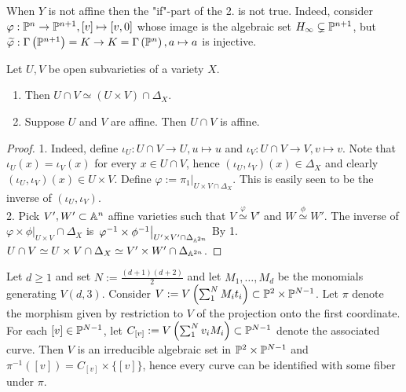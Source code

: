         \begin{remark}
            When $Y$ is not affine then the "if"-part of the 2. is not true. Indeed, consider $\varphi: \mathbb{P}^n\rightarrow \mathbb{P}^{n+1}, [v]\mapsto [v,0]$ whose image is the algebraic set $H_\infty \subsetneq \mathbb{P}^{n+1}$, but $\widetilde{\varphi}: \Gamma\left(\mathbb{P}^{n+1}\right)=K\rightarrow K= \Gamma\left(\mathbb{P}^n\right), a\mapsto a$ is injective. 
        \end{remark}
        \begin{proposition}
            Let $U,V$ be open subvarieties of a variety $X$.
            \begin{enumerate}
                \item Then $U\cap V\simeq (U\times V)\cap \Delta_X$.
                \item Suppose $U$ and $V$ are affine. Then $U\cap V$ is affine.
            \end{enumerate}
        \end{proposition}
        \begin{proof}
            1. Indeed, define $\iota_U: U\cap V\rightarrow U, u\mapsto u$ and $\iota_V: U\cap V\rightarrow V, v\mapsto v$. Note that $\iota_U(x)=\iota_V(x)$ for every $x\in U\cap V$, hence $(\iota_U,\iota_V)(x)\in \Delta_X$ and clearly $(\iota_U,\iota_V)(x)\in U\times V$. Define $\varphi := \left.\pi_1\right|_{U\times V\cap \Delta_X}$. This is easily seen to be the inverse of $(\iota_U,\iota_V)$.\\
            2. Pick $V',W'\subset \mathbb{A}^n$ affine varieties such that $V\overset{\varphi}{\simeq}V'$ and $W\overset{\phi}{\simeq} W'$. The inverse of $\left.\varphi\times \phi\right|_{U\times V}\cap \Delta_X$ is $\left.\varphi^{-1}\times \phi^{-1}\right|_{U'\times V'\cap \Delta_{\mathbb{A}^{2n}}}$ By 1. $U\cap V\simeq U\times V\cap \Delta_X \simeq V'\times W'\cap \Delta_{\mathbb{A}^{2n}}$.
        \end{proof}
        \begin{proposition}
            Let $d\geq 1$ and set $N:=\frac{(d+1)(d+2)}{2}$ and let $M_1,\dots,M_d$ be the monomials generating $V(d,3)$. Consider $V:= V\left(\sum_1^N M_it_i\right)\subset \mathbb{P}^2\times\mathbb{P}^{N-1}$. Let $\pi$ denote the morphism given by restriction to $V$ of the projection onto the first coordinate. For each $[v]\in \mathbb{P}^{N-1}$, let $C_{[v]}:=V\left(\sum_1^N v_iM_i\right)\subset \mathbb{P}^{N-1}$ denote the associated curve. Then $V$ is an irreducible algebraic set in $\mathbb{P}^{2}\times\mathbb{P}^{N-1}$ and $\pi^{-1}([v])=C_{[v]}\times \{[v]\}$, hence every curve can be identified with some fiber under $\pi$. 
        \end{proposition}
